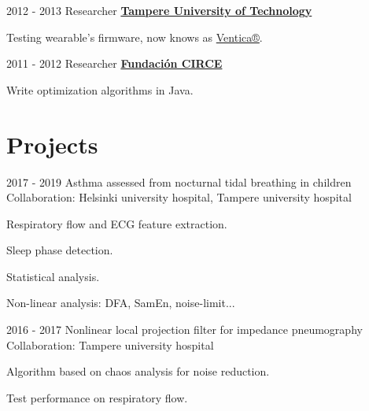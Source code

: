 \documentclass[letterpaper]{twentysecondcv} %
\begin{document}
\begin{RigthPage1}
\begin{twenty}
	\twentyitemlist
    	{2012 - 2013}
        {Researcher}
        {\href{https://www.tut.fi/}{\textbf{Tampere University of Technology}}}
        {
        \item Testing wearable's firmware, now knows as \href{https://www.ventica.net/}{Ventica®}.   }

	\twentyitemlist
    	{2011 - 2012}
        {Researcher}
        {\href{https://http://www.fcirce.es//}{\textbf{Fundaci\'on CIRCE}}}
        {
        \item Write optimization algorithms in Java.
        }
\end{twenty}

\section{Projects}
\begin{twenty} %
	\twentyitemlist
    	{2017 - 2019}
        {Asthma assessed from nocturnal tidal breathing in children~\cite{children,infants}}
        {\\Collaboration: Helsinki university hospital, Tampere university hospital }
        {        
        \item Respiratory flow and ECG feature extraction.
        \item Sleep phase detection.
        \item Statistical analysis.
        \item Non-linear analysis: DFA, SamEn, noise-limit...
        }
        

	\twentyitemlist
    	{2016 - 2017}
        {Nonlinear local projection filter for impedance pneumography~\cite{nlpf}}
        {\\Collaboration: Tampere university hospital }
        {
        \item Algorithm based on chaos analysis for noise reduction. 
        \item Test performance on respiratory flow.
		}
       

\end{twenty}
\end{RigthPage1}
\end{document}
